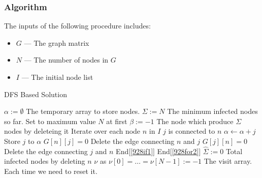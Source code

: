 \subsubsection{Algorithm}
The inputs of the following procedure includes:
\begin{itemize}
    \item $G$ --- The graph matrix
    \item $N$ --- The number of nodes in $G$
    \item $I$ --- The initial node list
\end{itemize}
\setcounter{algorithm}{0}
\begin{algorithm}[H]
\caption{DFS Based Solution}
\begin{algorithmic}[1]
\State $\alpha := \emptyset$ \Comment The temporary array to store nodes.
\State $\Sigma := N$ \Comment The minimum infected nodes so far. Set to maximum value $N$ at first
\State $\beta := -1$ \Comment The node which produce $\Sigma$ nodes by deleteing it
 \Comment Iterate over each node $n$ in $I$ \label{928for1}
 \label{928for2}
 \Comment $j$ is connected to $n$ \label{928if1}
\State $\alpha \gets \alpha + j$ \Comment Store $j$ to $\alpha$
\State $G[n][j] = 0$ \Comment Delete the edge connecting $n$ and $j$
\State $G[j][n] = 0$ \Comment Delete the edge connecting $j$ and $n$
\EndIf \Comment End[\ref{928if1}]
\EndFor \Comment End[\ref{928for2}]
\State $\hat{\Sigma}:=0$ \Comment Total infected nodes by deleting $n$
\State $\nu$ as $\nu[0] = \ldots = \nu[N-1] := -1$ \Comment The visit array. Each time we need to reset it.
\end{algorithmic}
\end{algorithm}

